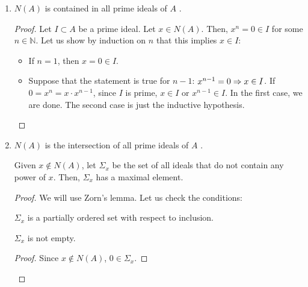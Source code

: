 \begin{problem}
\begin{enumerate}[label=(\theproblem.\arabic*),ref=\theproblem.\arabic*]
        \item \label{itm:nilradical_in_prme} $N(A)$ is contained in all prime ideals of $A$ .
            \begin{sol}
            \begin{proof}
                Let $I \subset A$ be a prime ideal.
                Let $x \in N(A)$.
                Then, $x^n = 0 \in I$ for some $n \in \mathbb{N}$.
                Let us show by induction on $n$ that this implies $x \in I$:
                \begin{itemize}
                    \item If $n=1$, then $x = 0 \in I$.
                    \item Suppose that the statement is true for $n-1$: $x^{n-1} = 0 \Rightarrow x \in I$.
                    If $0 = x^n = x \cdot x^{n-1}$,
                    since $I$ is prime, $x \in I$ or $x^{n-1} \in I$.
                    In the first case, we are done.
                    The second case is just the inductive hypothesis.
                \end{itemize}
            \end{proof}
            \end{sol}

        \item \label{itm:nilradical_is_intersection_of_all_primes} $N(A)$ is the intersection of all prime ideals of $A$ .
            \begin{sol}
                \begin{claim}
                    Given $x \notin N(A)$, let $\varSigma_x$ be the set of all ideals that do not contain any power of $x$.
                    Then, $\varSigma_x$ has a maximal element.
                    \begin{proof}
                        We will use Zorn's lemma.
                        Let us check the conditions:

                        \begin{claim}
                              $\varSigma_x$ is a partially ordered set with respect to inclusion.
                        \end{claim}

                        \begin{claim}
                            $\varSigma_x$ is not empty.
                            \begin{proof}
                                Since $x \notin N(A)$, ${0} \in \varSigma_x$.
                            \end{proof}
                        \end{claim}


\end{proof}
\end{claim}
\end{sol}
\end{enumerate}
\end{problem}
